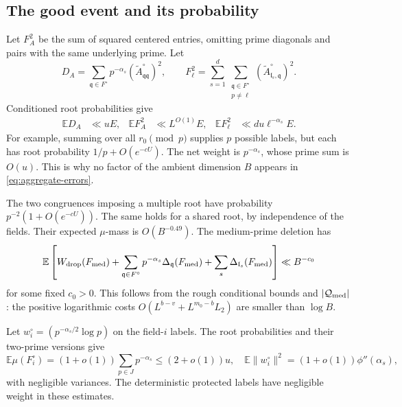 \subsection{The good event and its probability}

Let \(F_A^2\) be the sum of squared centered entries, omitting prime
diagonals and pairs with the same underlying prime.  Let
\[
 D_A=\sum_{\mathfrak q\in F^\circ}
           p^{-\alpha_s}(\widetilde A^\circ_{\mathfrak q\mathfrak q})^2,
 \qquad
 F_\ell^2=\sum_{s=1}^d
      \sum_{\substack{\mathfrak q\in F^\circ\\p\ne\ell}}
          (\widetilde A^\circ_{\mathfrak l_s,\mathfrak q})^2.
\]
Conditioned root probabilities give
\begin{align}
 \mathbb E D_A&\ll uE,&
 \mathbb E F_A^2&\ll L^{O(1)}E,&
 \mathbb E F_\ell^2&\ll du\ell^{-\alpha_s}E.\label{eq:aggregate-errors}
\end{align}
For example, summing over all \(r_0\pmod p\) supplies \(p\)
possible labels, but each has root probability \(1/p+O(e^{-cU})\).
The net weight is \(p^{-\alpha_s}\), whose prime sum is \(O(u)\).
This is why no factor of the ambient dimension \(B\) appears in
\eqref{eq:aggregate-errors}.

The two congruences imposing a multiple root have probability
\(p^{-2}(1+O(e^{-cU}))\).  The same holds for a shared root, by
independence of the fields.  Their expected \(\mu\)-mass is
\(O(B^{-0.49})\).  The medium-prime deletion has
\begin{equation}\label{eq:medium-drop}
 \mathbb E\left[W_{\rm drop}(F_{\rm med})
  +\sum_{\mathfrak q\in F^\circ}p^{-\alpha_s}
                    \Delta_{\mathfrak q}(F_{\rm med})
  +\sum_s\Delta_{\mathfrak l_s}(F_{\rm med})\right]
       \ll B^{-c_0}
\end{equation}
for some fixed \(c_0>0\).  This follows from the rough conditional
bounds and \(|\mathcal Q_{\rm med}|\): the positive logarithmic
costs \(O(L^{b-v}+L^{m_0-b}L_2)\) are smaller than \(\log B\).

Let \(w_i^\circ=(p^{-\alpha_s/2}\log p)\) on the field-\(i\)
labels.  The root probabilities and their two-prime versions give
\[
 \mathbb E\mu(F_i^\circ)=(1+o(1))\sum_{p\in J}p^{-\alpha_s}
       \le(2+o(1))u,
 \quad
 \mathbb E\|w_i^\circ\|^2=(1+o(1))\phi''(\alpha_s),
\]
with negligible variances.  The deterministic protected labels have
negligible weight in these estimates.

